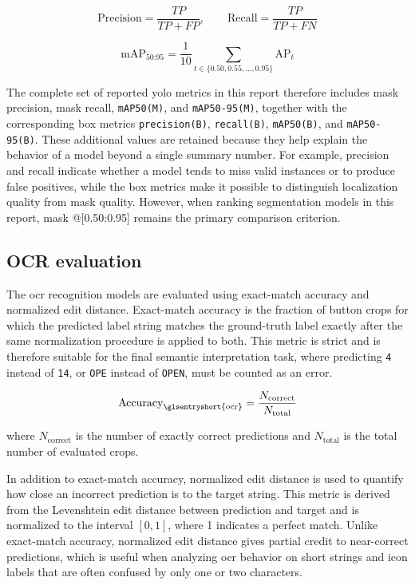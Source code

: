 \begin{equation}
\mathrm{Precision} = \frac{TP}{TP + FP}, \qquad
\mathrm{Recall} = \frac{TP}{TP + FN}
\end{equation}

\begin{equation}
\mathrm{mAP}_{50\text{:}95} = \frac{1}{10}\sum_{t \in \{0.50,0.55,\ldots,0.95\}} \mathrm{AP}_{t}
\end{equation}

The complete set of reported \gls{yolo} metrics in this report therefore includes
mask precision, mask recall, \texttt{mAP50(M)}, and \texttt{mAP50-95(M)}, together
with the corresponding box metrics \texttt{precision(B)}, \texttt{recall(B)},
\texttt{mAP50(B)}, and \texttt{mAP50-95(B)}. These additional values are retained
because they help explain the behavior of a model beyond a single summary number.
For example, precision and recall indicate whether a model tends to miss valid
instances or to produce false positives, while the box metrics make it possible
to distinguish localization quality from mask quality. However, when ranking
segmentation models in this report, mask @[0.50:0.95] remains
the primary comparison criterion.

\subsection{OCR evaluation}

The \gls{ocr} recognition models are evaluated using exact-match accuracy and
normalized edit distance. Exact-match accuracy is the fraction of button crops for
which the predicted label string matches the ground-truth label exactly after the
same normalization procedure is applied to both. This metric is strict and is
therefore suitable for the final semantic interpretation task, where predicting
\texttt{4} instead of \texttt{14}, or \texttt{OPE} instead of \texttt{OPEN}, must
be counted as an error.

\begin{equation}
\mathrm{Accuracy}_{\text{\glsentryshort{ocr}}} = \frac{N_{\text{correct}}}{N_{\text{total}}}
\end{equation}

where $N_{\text{correct}}$ is the number of exactly correct predictions and
$N_{\text{total}}$ is the total number of evaluated crops.

In addition to exact-match accuracy, normalized edit distance is used to quantify
how close an incorrect prediction is to the target string. This metric is derived
from the Levenshtein edit distance between prediction and target and is normalized
to the interval $[0,1]$, where 1 indicates a perfect match. Unlike exact-match
accuracy, normalized edit distance gives partial credit to near-correct
predictions, which is useful when analyzing \gls{ocr} behavior on short strings and icon
labels that are often confused by only one or two characters.

